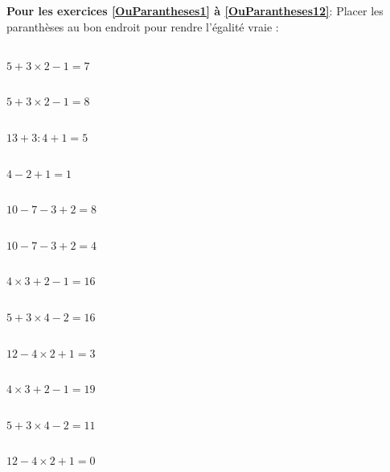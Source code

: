 \textbf{Pour les exercices \ref{OuParantheses1} à  \ref{OuParantheses12}}: Placer les paranthèses au bon endroit pour rendre l'égalité vraie :

\begin{multicols}{3}
    \\
    $5+3\times 2-1=7$

    \\
    $5+3\times 2-1=8$

    \\
    $13+3: 4 +1=5$
\end{multicols}

\begin{multicols}{3}
    \\
    $4-2+1=1$

    \\
    $10-7-3+2=8$

    \\
    $10-7-3+2=4$
\end{multicols}

\begin{multicols}{3}
    \\
    $4\times 3+2-1=16$

    \\
    $5+3\times 4-2=16$

    \\
    $12-4\times 2+1=3$
\end{multicols}

\begin{multicols}{3}
    \\
    $4\times 3+2-1=19$

    \\
    $5+3\times 4-2=11$

    \\
    $12-4\times 2+1=0$
\end{multicols}
